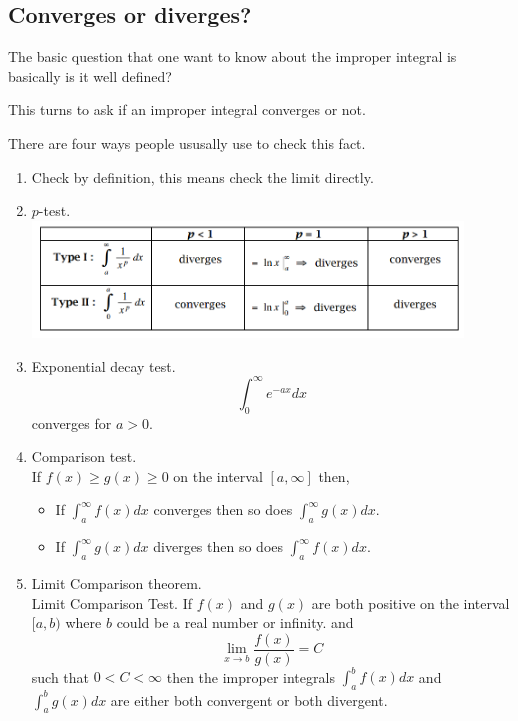 \documentclass[12pt]{article}
\theoremstyle{definition}
\theoremstyle{definition}
\theoremstyle{remark}
\theoremstyle{definition}
\theoremstyle{definition}
\theoremstyle{definition}
\begin{document}
\subsection{Converges or diverges?}
The basic question that one want to know about the improper integral is basically is it well defined?

This turns to ask if an improper integral converges or not.

There are four ways people ususally use to check this fact.
\begin{enumerate}
	\item Check by definition, this means check the limit directly.
	\item $p$-test.\\
	\includegraphics*[width=0.9\textwidth]{1.png}
	\item Exponential decay test. 
	\[\int^\infty_0 e^{-ax} dx\] converges for $a>0$.
	\item Comparison test.\\
	If $f(x)\geq g(x) \geq 0$ on the interval $[a,\infty]$ then,\begin{itemize}
	\item If $\int^\infty_a f(x) dx$ converges then so does $\int^\infty_a g(x) dx$.
	\item If $\int^\infty_a g(x) dx$ diverges then so does $\int^\infty_a f(x) dx$.
	\end{itemize}
	\item Limit Comparison theorem.\\
	Limit Comparison Test. If $f(x)$ and $g(x)$ are both positive  on the interval $[a,b)$ where $b$ could be a real number or infinity.
	and
	\[\lim_{x\to b}\frac{f(x)}{g(x)} = C\] such that $0 < C < \infty$
	then the improper integrals $\int^b_a f(x) dx$ and $\int^b_a g(x) dx$ are either both convergent or both divergent.

\end{enumerate}
\end{document}
